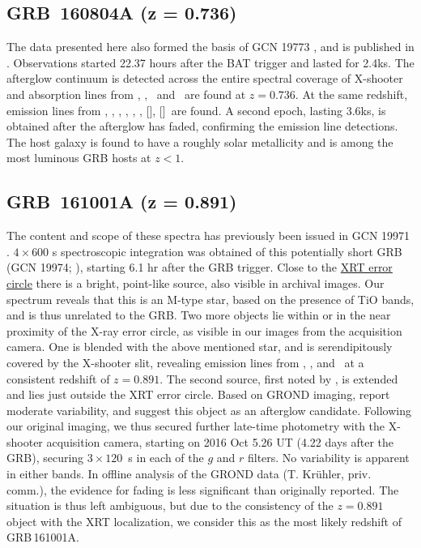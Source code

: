 \documentclass{aa}    %
\begin{document}
\subsection{GRB~160804A (z = 0.736)}\label{160804}

The data presented here also formed the basis of GCN 19773 \citep{GCN19773}, and
is published in \citet{Heintz2017b}. Observations started 22.37 hours after the
BAT trigger and lasted for 2.4ks. The afterglow continuum is detected across the
entire spectral coverage of X-shooter and absorption lines from \mgi, \mgii,
\feii~and \alii~are found at $z = 0.736$. At the same redshift, emission lines
from \oii, \oiii, \ha, \hb, \hg, \nii, [\sii], [\siii]~are found. A second epoch,
lasting 3.6ks, is obtained after the afterglow has faded, confirming the
emission line detections. The host galaxy is found to have a roughly solar
metallicity and is among the most luminous GRB hosts at $z < 1$.


\subsection{GRB~161001A (z = 0.891)}	\label{161001}

The content and scope of these spectra has previously been issued in GCN 19971
\citep{GCN19971}. $4 \times 600$ s spectroscopic integration was obtained of
this potentially short GRB (GCN 19974; \citealt{GCN19974}), starting 6.1 hr
after the GRB trigger. Close to the
\href{http://www.swift.ac.uk/xrt_positions/00020702/}{XRT error circle}
\citep{GCN19969} there is a bright, point-like source, also visible in archival
images. Our spectrum reveals that this is an M-type star, based on the presence
of TiO bands, and is thus unrelated to the GRB. Two more objects lie within or
in the near proximity of the X-ray error circle, as visible in our images from
the acquisition camera. One is blended with the above mentioned star, and is
serendipitously covered by the X-shooter slit, revealing emission lines from
\oii, \hb, and \ha~at a consistent redshift of $z = 0.891$. The second source,
first noted by \citet{GCN19975}, is extended and lies just outside the XRT error
circle. Based on GROND imaging, \citep{GCN19975} report moderate variability,
and suggest this object as an afterglow candidate. Following our original
imaging, we thus secured further late-time photometry with the X-shooter
acquisition camera, starting on 2016 Oct 5.26 UT (4.22 days after the GRB),
securing $3 \times 120$~s in each of the $g$ and $r$ filters. No variability is
apparent in either bands. In offline analysis of the GROND data (T. Kr\"uhler,
priv. comm.), the evidence for fading is less significant than originally
reported. The situation is thus left ambiguous, but due to the consistency of
the $z = 0.891$ object with the XRT localization, we consider this as the most
likely redshift of GRB\,161001A.
\end{document}
